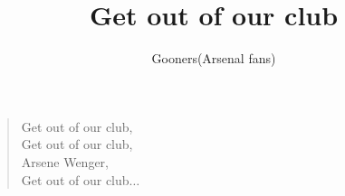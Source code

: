 \documentclass[a4paper,12pt]{article}
\title{Get out of our club}
\author{Gooners(Arsenal fans)}
\date{}
\begin{document}
	
	\maketitle
	
	\begin{verse}
		
		Get out of our club, \\
		Get out of our club, \\
		Arsene Wenger, \\
		Get out of our club$\ldots$
		
	\end{verse}
	
\end{document}
